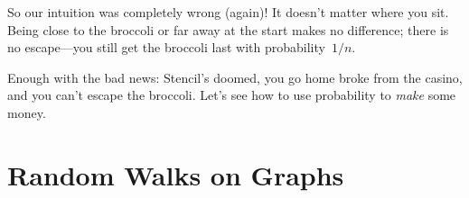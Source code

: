 So our intuition was completely wrong (again)!  It doesn't matter
where you sit.  Being close to the broccoli or far away at the start
makes no difference; there is no escape---you still get the broccoli
last with probability~$1/n$.

Enough with the bad news: Stencil's doomed, you go home broke from the
casino, and you can't escape the broccoli.  Let's see how to use
probability to \emph{make} some money.

\section{Random Walks on Graphs}

\problemsection

\endinput
